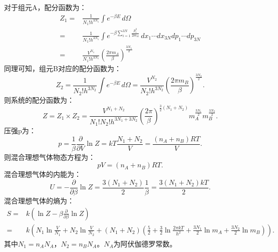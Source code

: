 \documentclass[a4paper,12pt]{article}
\begin{document}
\section{}
对于组元A，配分函数为：
\begin{equation*}
\begin{aligned}
	Z_1 =& \frac{1}{N_1!h^{3N_1}}\int e^{-\beta E} \,d\Omega \\ 
	=& \frac{1}{N_1!h^{3N_1}} \int e^{-\beta\sum_{i=1}^{3N}\frac{p_i^2}{2m_A}} \,dx_1\cdots dx_{3N} dp_1 \cdots dp_{3N} \\
	=& \frac{V^{N_1}}{N_1!h^{3N_1}} \left( \frac{2\pi m_A}{\beta} \right)^{\frac{3N_1}{2}} 
\end{aligned}
\end{equation*}
同理可知，组元B对应的配分函数为：
\begin{equation*}
	Z_2 = \frac{1}{N_2!h^{3N_2}}\int e^{-\beta E} \,d\Omega = \frac{V^{N_2}}{N_2!h^{3N_2}} \left( \frac{2\pi m_B}{\beta} \right)^{\frac{3N_2}{2}}.
\end{equation*}
则系统的配分函数为：
\begin{equation*}
	Z = Z_1 \times Z_2 = \frac{V^{N_1+N_2}}{N_1!N_2!h^{3N_1+3N_2}} \left( \frac{2\pi}{\beta} \right)^{\frac{3}{2}(N_1+N_2)}m_A^{\frac{3N_1}{2}}m_B^{\frac{3N_2}{2}}.
\end{equation*}
压强p为：
\begin{equation*}
	p = \frac{1}{\beta}\frac{\partial}{\partial V} \ln Z = kT\frac{N_1+N_2}{V} = \frac{(n_A+n_B)RT}{V}.
\end{equation*}
则混合理想气体物态方程为：
\begin{equation*}
	pV = (n_A + n_B)RT.
\end{equation*}
混合理想气体的内能为：
\begin{equation*}
	U = -\frac{\partial }{\partial \beta} \ln Z = \frac{3(N_1+N_2)}{2}\frac{1}{\beta} = \frac{3(N_1+N_2)kT}{2}.
\end{equation*}
混合理想气体的熵为：
\begin{equation*}
\begin{aligned}
	S =& k\left( \ln Z - \beta\frac{\partial}{\partial \beta}\ln Z \right) \\ 
	=& k \left( N_1\ln\frac{V}{N_1} + N_2\ln\frac{V}{N_2} + (N_1+N_2)\left( \frac{5}{2} + \frac{3}{2}\ln\frac{2\pi kT}{h^2} + \frac{3N_1}{2}\ln m_A + \frac{3N_2}{2}\ln m_B \right) \right).
\end{aligned}
\end{equation*}
其中$N_1 = n_A N_A$，$N_2 = n_B N_A$。$N_A$为阿伏伽德罗常数。
\end{document}
